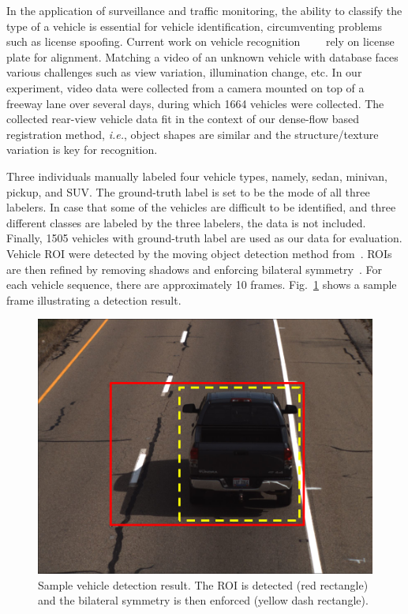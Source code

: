 \documentclass[10pt,journal]{IEEEtran}
\begin{document}
In the application of surveillance and traffic monitoring, the ability to classify the type of a vehicle is essential for vehicle identification, circumventing problems such as license spoofing. Current work on vehicle recognition~\cite{Petrovic04}~\cite{Negri06}~\cite{Zafar09}~\cite{Pearce11} rely on license plate for alignment. Matching a video of an unknown vehicle with database faces various challenges such as view variation, illumination change, etc. In our experiment, video data were collected from a camera mounted on top of a freeway lane over several days, during which 1664 vehicles were collected. The collected rear-view vehicle data fit in the context of our dense-flow based registration method, \textit{i.e.}, object shapes are similar and the structure/texture variation is key for recognition. 

Three individuals manually labeled four vehicle types, namely, sedan, minivan, pickup, and SUV. The ground-truth label is set to be the mode of all three labelers. In case that some of the vehicles are difficult to be identified, and three different classes are labeled by the three labelers, the data is not included. Finally, 1505 vehicles with ground-truth label are used as our data for evaluation. Vehicle ROI were detected by the moving object detection method from~\cite{Thakoor05}. ROIs are then refined by removing shadows and enforcing bilateral symmetry~\cite{Thakoor13}. For each vehicle sequence, there are approximately 10 frames. Fig.~\ref{fig:vehicle_raw_data} shows a sample frame illustrating a detection result.  

\begin{figure}[htbp]
	\centering
		\includegraphics[width=.9\columnwidth]{fig/vehicle_raw_data.png}
	\caption{Sample vehicle detection result. The ROI is detected (red rectangle) and the bilateral symmetry is then enforced (yellow dash rectangle).}
	\label{fig:vehicle_raw_data}
\end{figure}
\end{document}
